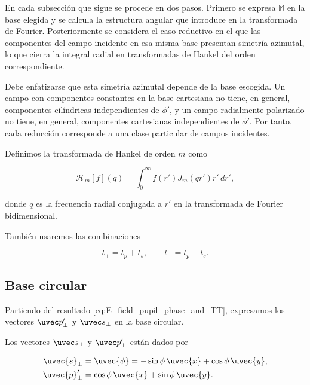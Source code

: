 En cada subsección que sigue se procede en dos pasos. Primero se expresa $\mathbb{M}$ en la base elegida y se calcula la estructura angular que introduce en la transformada de Fourier. Posteriormente se considera el caso reductivo en el que las componentes del campo incidente en esa misma base presentan simetría azimutal, lo que cierra la integral radial en transformadas de Hankel del orden correspondiente.

Debe enfatizarse que esta simetría azimutal depende de la base escogida. Un campo con componentes constantes en la base cartesiana no tiene, en general, componentes cilíndricas independientes de $\phi'$, y un campo radialmente polarizado no tiene, en general, componentes cartesianas independientes de $\phi'$. Por tanto, cada reducción corresponde a una clase particular de campos incidentes.

Definimos la transformada de Hankel de orden $m$ como

\begin{equation}
\mathscr H_m[f](q)
=
\int_0^\infty
f(r')J_m(qr')r'\,dr',
\label{eq:def_Hankel_Transform_m_order}
\end{equation}

donde $q$ es la frecuencia radial conjugada a $r'$ en la transformada de Fourier bidimensional.

También usaremos las combinaciones

\begin{equation}
t_+
=
t_p+t_s,
\qquad
t_-
=
t_p-t_s.
\label{eq:t_plus_t_minus_def}
\end{equation}

\subsection{Base circular}

Partiendo del resultado \eqref{eq:E_field_pupil_phase_and_TT}, expresamos los vectores $\uvec p'_\perp$ y $\uvec s_\perp$ en la base circular.

Los vectores $\uvec s_\perp$ y $\uvec p'_\perp$ están dados por

\begin{align}
\uvec{s}_\perp
&=
\uvec{\phi}
=
-\sin\phi\,\uvec{x}
+
\cos\phi\,\uvec{y},
\\
\uvec{p}'_\perp
&=
\cos\phi\,\uvec{x}
+
\sin\phi\,\uvec{y}.
\end{align}

